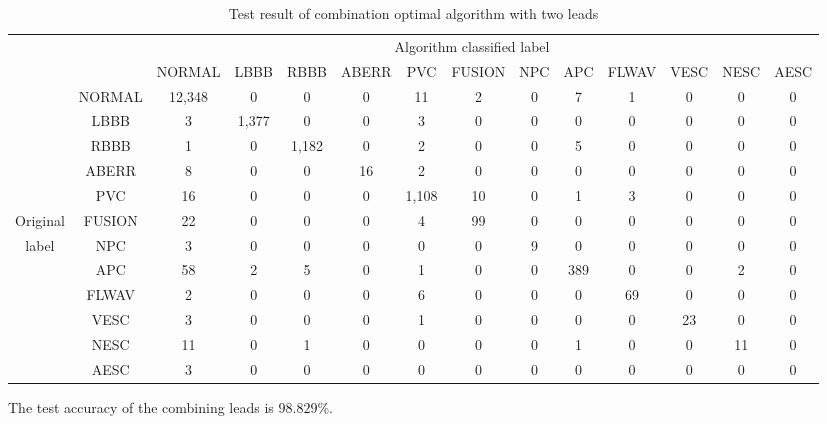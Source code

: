 \documentclass[conference]{IEEEtran}
\begin{document}
\begin{table}[!htbp]
\small
\begin{center}
\begin{lrbox}{\tablebox}
\begin{threeparttable}
\caption{Test result of combination optimal algorithm with two leads}
\label{table4}
\begin{tabular}{cccccccccccccc}
\hline
\multicolumn{9}{r}{Algorithm classified label} \\
\cline{3-14}
		 &      & NORMAL & LBBB & RBBB & ABERR & PVC & FUSION & NPC & APC & FLWAV & VESC & NESC & AESC\\
\hline
 		 & NORMAL & 12,348& 0   &  0   &  0   &  11  &  2    &	0   &  7  &   1   &   0  &  0  &  0 \\
	     & LBBB   &  3    & 1,377&  0  &  0   &  3   &  0    &  0   &  0  &   0   &   0  &  0  &  0 \\
		 & RBBB   &  1    &  0  & 1,182&  0   &  2   &  0    &	0   &  5  &   0   &   0  &  0  &  0 \\
		 & ABERR  &  8    &  0  &  0   &  16  &  2   &  0    &	0   &  0  &   0   &   0  &  0  &  0 \\
		 & PVC    &  16   &  0  &  0   &  0   & 1,108&  10   &	0   &  1  &   3   &   0  &  0  &  0 \\
Original & FUSION &	 22   &  0  &  0   &  0   &  4   &   99  &	0   &  0  &   0   &   0  &  0  &  0 \\
label    & NPC    &	 3    &  0  &  0   &  0   &  0   &  0    &	9   &  0  &   0   &   0  &  0  &  0 \\
		 & APC    &	 58   &  2  &  5   &  0   &  1   &  0    &	0   &  389&   0   &   0  &  2  &  0 \\
		 & FLWAV  &	 2    &  0  &  0   &  0   &  6   &  0    &	0   &  0  &   69  &   0  &  0  &  0 \\
		 & VESC   &	 3    &  0  &  0   &  0   &  1   &  0    &	0   &  0  &   0   &  23  &  0  &  0 \\
		 & NESC   &	 11   &  0  &  1   &  0   &  0   &  0    &	0   &  1  &   0   &   0  &  11 &  0 \\
		 & AESC   &	 3    &  0  &  0   &  0   &  0   &  0    &	0   &  0  &   0   &   0  &  0  &  0 \\
\hline
\end{tabular}
\begin{tablenotes}
\item The test accuracy of the combining leads is $98.829\%$.
\end{tablenotes}
\end{threeparttable}
\end{lrbox}
\scalebox{0.96}{\usebox{\tablebox}}
\end{center}
\end{table}
\end{document}
